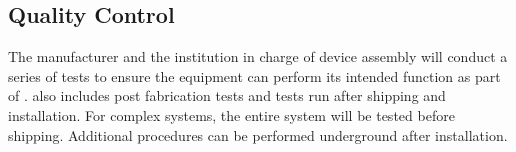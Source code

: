 \subsection{ Quality Control}

The manufacturer and the institution in charge of device assembly will
conduct a series of tests to ensure the equipment can perform its
intended function as part of .  also includes post fabrication
tests and tests run after shipping and installation. For complex
systems, the entire system will be tested before shipping. Additional
 procedures can be performed underground after installation.

